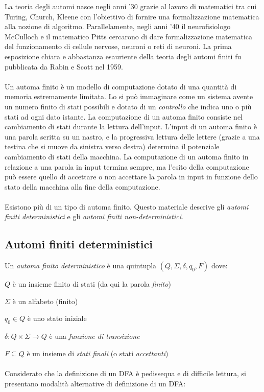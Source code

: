 \documentclass[]{article}
\begin{document}
La teoria degli automi nasce negli anni '30 grazie al lavoro di matematici tra cui Turing, Church, Kleene
con l'obiettivo di fornire una formalizzazione matematica alla nozione di algoritmo. Parallelamente, negli
anni '40 il neurofisiologo McCulloch e il matematico Pitts cercarono di dare formalizzazione matematica del
funzionamento di cellule nervose, neuroni o reti di neuroni. La prima esposizione chiara e abbastanza
esauriente della teoria degli automi finiti fu pubblicata da Rabin e Scott nel 1959.
\\
\\
Un automa finito è un modello di computazione dotato di una quantità di memoria estremamente limitata. Lo
si può immaginare come un sistema avente un numero finito di stati possibili e dotato di un \textit{controllo}
che indica uno o più stati ad ogni dato istante. La computazione di un automa finito consiste nel cambiamento
di stati durante la lettura dell'input. L'input di un automa finito è una parola scritta su un nastro, e la
progressiva lettura delle lettere (grazie a una testina che si muove da sinistra verso destra) determina il
potenziale cambiamento di stati della macchina. La computazione di un automa finito in relazione a una
parola in input termina sempre, ma l'esito della computazione può essere quello di accettare o non accettare
la parola in input in funzione dello stato della macchina alla fine della computazione.
\\
\\
Esistono più di un tipo di automa finito. Questo materiale descrive gli \textit{automi finiti deterministici}
e gli \textit{automi finiti non-deterministici}.


\subsection{Automi finiti deterministici}
Un \textit{automa finito deterministico} è una quintupla \mbox{$(Q, \Sigma, \delta, q_0, F)$} dove:

\mbox{$Q$} è un insieme finito di stati (da qui la parola \textit{finito})

\mbox{$\Sigma$} è un alfabeto (finito)

\mbox{$q_0 \in Q$} è uno stato iniziale

\mbox{$\delta \colon Q \times \Sigma \to Q$} è una \textit{funzione di transizione}

\mbox{$F \subseteq Q$} è un insieme di \textit{stati finali} (o stati \textit{accettanti})
\\
\\
Considerato che la definizione di un DFA è pedissequa e di difficile lettura, si presentano modalità alternative di definizione di un DFA:
\end{document}
